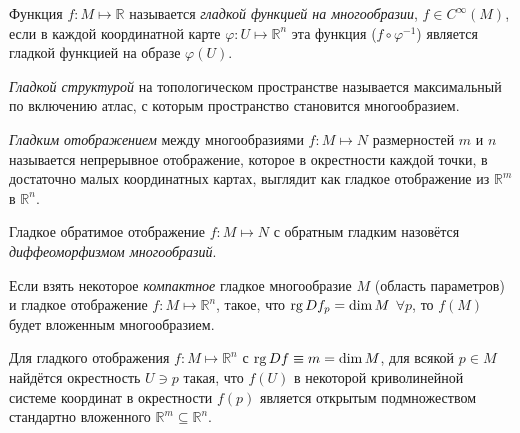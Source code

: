 
\begin{to_def} 
    Функция $f \colon M \mapsto \mathbb{R}$ называется \textit{гладкой функцией на многообразии}, $f \in C^{\infty}(M)$, если в каждой координатной карте $\varphi \colon U \mapsto \mathbb{R}^n$ эта функция ($f \circ \varphi^{-1}$) является гладкой функцией на образе $\varphi(U)$.
\end{to_def}



\begin{to_def} 
    \textit{Гладкой структурой} на топологическом пространстве называется максимальный по включению атлас, с которым пространство становится многообразием. 
\end{to_def}


\begin{to_def} 
    \textit{Гладким отображением} между многообразиями $f \colon M \mapsto N$ размерностей $m$ и $n$ называется непрерывное отображение, которое в окрестности каждой точки, в достаточно малых координатных картах, выглядит как гладкое отображение из $\mathbb{R}^m$ в $\mathbb{R}^n$.
\end{to_def}


\begin{to_def} 
    Гладкое обратимое отображение $f \colon M \mapsto N$ с обратным гладким назовётся \textit{диффеоморфизмом многообразий}. 
\end{to_def}

\begin{to_tas} 
\label{task_6.131} %
    Если взять некоторое \textit{компактное} гладкое многообразие $M$ (область параметров) и гладкое отображение $f \colon M \mapsto \mathbb{R}^n$, такое, что $\mathop{\mathrm{rg}}\nolimits Df_p = \dim M$ $\forall p$, то $f(M)$ будет вложенным многообразием.     
\end{to_tas}

\begin{to_lem} 
    Для гладкого отображения $f \colon M \mapsto \mathbb{R}^n$ с $\mathop{\mathrm{rg}}\nolimits Df \equiv m = \dim M$, для всякой $p \in M$ найдётся окрестность $U \ni p$ такая, что $f(U)$ в некоторой криволинейной системе координат в окрестности $f(p)$ является открытым подмножеством стандартно вложенного $\mathbb{R}^m \subseteq \mathbb{R}^n$. 
\end{to_lem}
